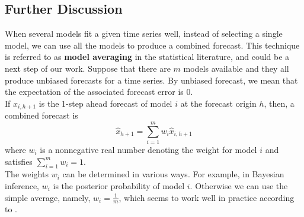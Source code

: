 \subsection{Further Discussion}
When several models fit a given time series well, instead of selecting a single model, we can use all the models to produce a combined forecast. This technique is referred to as \textbf{model averaging} in the statistical literature, and could be a next step of our work. Suppose that there are $m$ models available and they all produce unbiased forecasts for a time series. By unbiased forecast, we mean that the expectation of the associated forecast error is 0. \\
If $\hat{x}_{i,h+1}$ is the 1-step ahead forecast of model $i$ at the forecast origin $h$, then, a combined forecast is
$$ \hat{x}_{h+1} = \sum_{i=1}^m w_i \hat{x}_{i,h+1}$$
where $w_i$ is a nonnegative real number denoting the weight for model $i$ and satisfies $\sum_{i=1}^m w_i =1$. \\
The weights $w_i$ can be determined in various ways. For example, in
Bayesian inference, $w_i$ is the posterior probability of model $i$. Otherwise we can use the simple
average, namely, $w_i = \frac{1}{m}$, which seems to work well in practice according to \cite{tsa2012}.



